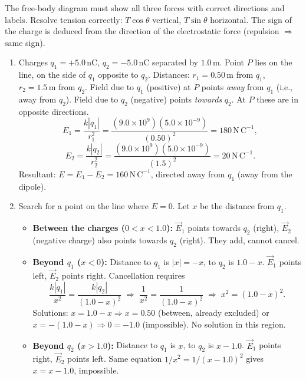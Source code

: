 \documentclass[11pt]{article}
\begin{document}
\begin{attention}
The free-body diagram must show all three forces with correct directions and labels. Resolve tension correctly: $T\cos\theta$ vertical, $T\sin\theta$ horizontal. The sign of the charge is deduced from the direction of the electrostatic force (repulsion $\Rightarrow$ same sign).
\end{attention}

\begin{corrige}
\begin{enumerate}
\item Charges $q_{1} = +5.0\,\mathrm{nC}$, $q_{2} = -5.0\,\mathrm{nC}$ separated by $1.0\,\mathrm{m}$. Point $P$ lies on the line, on the side of $q_{1}$ opposite to $q_{2}$. Distances: $r_{1} = 0.50\,\mathrm{m}$ from $q_{1}$, $r_{2} = 1.5\,\mathrm{m}$ from $q_{2}$.
Field due to $q_{1}$ (positive) at $P$ points \emph{away} from $q_{1}$ (i.e., away from $q_{2}$). Field due to $q_{2}$ (negative) points \emph{towards} $q_{2}$. At $P$ these are in opposite directions.
\[
E_{1} = \frac{k|q_{1}|}{r_{1}^{2}} = \frac{(9.0\times 10^{9})(5.0\times 10^{-9})}{(0.50)^{2}} = 180\,\mathrm{N\,C^{-1}},
\]
\[
E_{2} = \frac{k|q_{2}|}{r_{2}^{2}} = \frac{(9.0\times 10^{9})(5.0\times 10^{-9})}{(1.5)^{2}} = 20\,\mathrm{N\,C^{-1}}.
\]
Resultant: $E = E_{1} - E_{2} = 160\,\mathrm{N\,C^{-1}}$, directed away from $q_{1}$ (away from the dipole).
\item Search for a point on the line where $E=0$. Let $x$ be the distance from $q_{1}$.
\begin{itemize}
\item \textbf{Between the charges ($0 < x < 1.0$):} $\vec{E}_{1}$ points towards $q_{2}$ (right), $\vec{E}_{2}$ (negative charge) also points towards $q_{2}$ (right). They add, cannot cancel.
\item \textbf{Beyond $q_{1}$ ($x < 0$):} Distance to $q_{1}$ is $|x| = -x$, to $q_{2}$ is $1.0 - x$. $\vec{E}_{1}$ points left, $\vec{E}_{2}$ points right. Cancellation requires
\[
\frac{k|q_{1}|}{x^{2}} = \frac{k|q_{2}|}{(1.0 - x)^{2}} \;\Rightarrow\; \frac{1}{x^{2}} = \frac{1}{(1.0 - x)^{2}} \;\Rightarrow\; x^{2} = (1.0 - x)^{2}.
\]
Solutions: $x = 1.0 - x \Rightarrow x = 0.50$ (between, already excluded) or $x = -(1.0 - x) \Rightarrow 0 = -1.0$ (impossible). No solution in this region.
\item \textbf{Beyond $q_{2}$ ($x > 1.0$):} Distance to $q_{1}$ is $x$, to $q_{2}$ is $x - 1.0$. $\vec{E}_{1}$ points right, $\vec{E}_{2}$ points left. Same equation $1/x^{2} = 1/(x-1.0)^{2}$ gives $x = x - 1.0$, impossible.

\end{itemize}
\end{enumerate}
\end{corrige}
\end{document}
